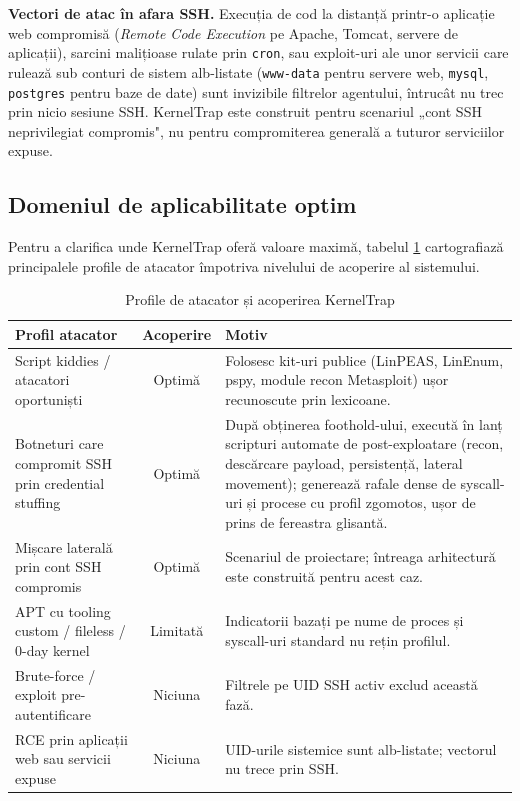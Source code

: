 \textbf{Vectori de atac în afara SSH.} Execuția de cod la distanță printr-o
aplicație web compromisă (\textit{Remote Code Execution} pe Apache, Tomcat,
servere de aplicații), sarcini malițioase rulate prin \texttt{cron}, sau
exploit-uri ale unor servicii care rulează sub conturi de sistem alb-listate
(\texttt{www-data} pentru servere web, \texttt{mysql}, \texttt{postgres}
pentru baze de date) sunt invizibile filtrelor agentului, întrucât nu trec
prin nicio sesiune SSH. KernelTrap este construit pentru scenariul „cont
SSH neprivilegiat compromis", nu pentru compromiterea generală a tuturor
serviciilor expuse.

\subsection{Domeniul de aplicabilitate optim}

Pentru a clarifica unde KernelTrap oferă valoare maximă, tabelul
\ref{tab:cap6-fit} cartografiază principalele profile de atacator
împotriva nivelului de acoperire al sistemului.

\begin{table}[h]
  \centering
  \caption{Profile de atacator și acoperirea KernelTrap}
  \label{tab:cap6-fit}
  \renewcommand{\arraystretch}{1.08}
  \begin{tabular}{|p{}|c|p{}|}
    \hline
    \textbf{Profil atacator} & \textbf{Acoperire} & \textbf{Motiv} \\
    \hline\hline
    Script kiddies / atacatori oportuniști                 & Optimă   & Folosesc kit-uri publice (LinPEAS, LinEnum, pspy, module recon Metasploit) ușor recunoscute prin lexicoane. \\
    \hline
    Botneturi care compromit SSH prin credential stuffing  & Optimă   & După obținerea foothold-ului, execută în lanț scripturi automate de post-exploatare (recon, descărcare payload, persistență, lateral movement); generează rafale dense de syscall-uri și procese cu profil zgomotos, ușor de prins de fereastra glisantă. \\
    \hline
    Mișcare laterală prin cont SSH compromis              & Optimă   & Scenariul de proiectare; întreaga arhitectură este construită pentru acest caz. \\
    \hline
    APT cu tooling custom / fileless / 0-day kernel        & Limitată & Indicatorii bazați pe nume de proces și syscall-uri standard nu rețin profilul. \\
    \hline
    Brute-force / exploit pre-autentificare                & Niciuna  & Filtrele pe UID SSH activ exclud această fază. \\
    \hline
    RCE prin aplicații web sau servicii expuse             & Niciuna  & UID-urile sistemice sunt alb-listate; vectorul nu trece prin SSH. \\
    \hline
  \end{tabular}
\end{table}

